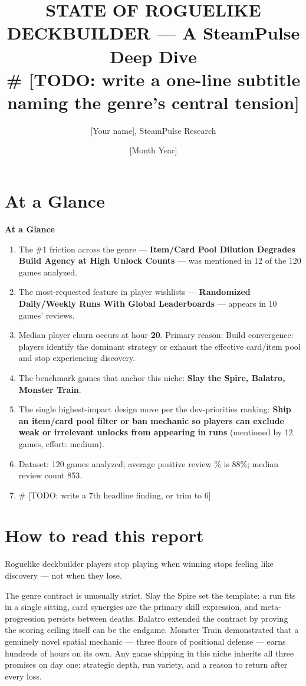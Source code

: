 \documentclass[11pt,letterpaper]{report}
\author{{[}Your name], SteamPulse Research}
\date{{[}Month Year]}
\title{STATE OF ROGUELIKE DECKBUILDER — A SteamPulse Deep Dive\\\medskip
\large \# [TODO: write a one-line subtitle naming the genre's central tension]}
\begin{document}
\maketitle
\part*{At a Glance}
\label{sec:org898f627}
\textbf{At a Glance}

\begin{enumerate}
\item The \#1 friction across the genre — \textbf{Item/Card Pool Dilution Degrades Build Agency at High Unlock Counts} — was mentioned in 12 of the 120 games analyzed.
\item The most-requested feature in player wishlists — \textbf{Randomized Daily/Weekly Runs With Global Leaderboards} — appears in 10 games' reviews.
\item Median player churn occurs at hour \textbf{20}. Primary reason: Build convergence: players identify the dominant strategy or exhaust the effective card/item pool and stop experiencing discovery.
\item The benchmark games that anchor this niche: \textbf{Slay the Spire, Balatro, Monster Train}.
\item The single highest-impact design move per the dev-priorities ranking: \textbf{Ship an item/card pool filter or ban mechanic so players can exclude weak or irrelevant unlocks from appearing in runs} (mentioned by 12 games, effort: medium).
\item Dataset: 120 games analyzed; average positive review \% is 88\%; median review count 853.
\item \# [TODO: write a 7th headline finding, or trim to 6]
\end{enumerate}
\part*{How to read this report}
\label{sec:org2bc25c8}
Roguelike deckbuilder players stop playing when winning stops feeling like discovery — not when they lose.

The genre contract is unusually strict. Slay the Spire set the template: a run fits in a single sitting, card synergies are the primary skill expression, and meta-progression persists between deaths. Balatro extended the contract by proving the scoring ceiling itself can be the endgame. Monster Train demonstrated that a genuinely novel spatial mechanic — three floors of positional defense — earns hundreds of hours on its own. Any game shipping in this niche inherits all three promises on day one: strategic depth, run variety, and a reason to return after every loss.
\end{document}

